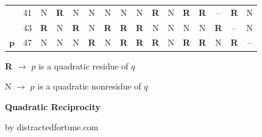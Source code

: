 \documentclass[17pt]{memoir}
\begin{document}
\begin{tabular}{@{}l@{\hskip 8mm}l|cccccccccccccc@{}}
                     & 41                       & N                         & \textbf{R} & N                         & N                         & N                         & N                         & N                         & \textbf{R} & N                         & \textbf{R} & \textbf{R} & --  & \textbf{R} & N                         \\
                     & 43                       & \textbf{R} & N                         & \textbf{R} & N                         & \textbf{R} & \textbf{R} & \textbf{R} & N                         & N                         & N                         & N                         & \textbf{R} & --  & N                         \\
\multirow{-14}{*}{$\boldsymbol{p}$} & 47                       & N                         & N                         & N                         & \textbf{R} & N                         & \textbf{R} & \textbf{R} & \textbf{R} & N                         & \textbf{R} & \textbf{R} & N                         & \textbf{R} & -- 
\end{tabular}

\medskip

\quad\quad\quad\quad\quad \textbf{R} $\rightarrow$ {\large $p$ is a quadratic residue of $q$}

\quad\quad\quad\quad\quad N $\rightarrow$ {\large $p$ is a quadratic nonresidue of $q$}

\newpage

\Large
\begin{center}
  \textbf{Quadratic Reciprocity}

  by distractedfortune.com
\end{center}
\end{document}
